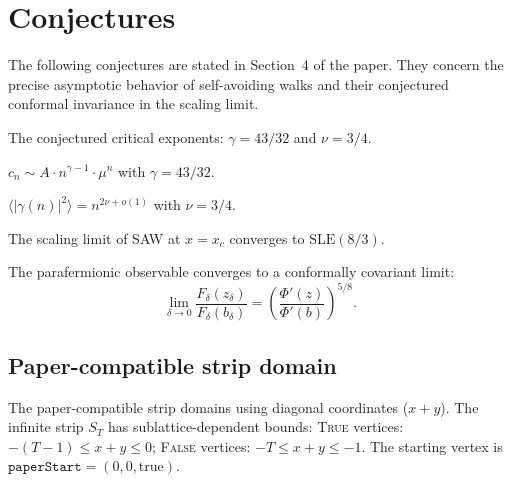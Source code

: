 \chapter{Conjectures}\label{chap:conjectures}

The following conjectures are stated in Section~4 of the paper.
They concern the precise asymptotic behavior of self-avoiding walks
and their conjectured conformal invariance in the scaling limit.

\begin{definition}\label{def:exponents}
\leanok
{}
  The conjectured critical exponents: $\gamma = 43/32$ and $\nu = 3/4$.
\end{definition}

\begin{conjecture}\label{conj:nienhuis}
\leanok
{}
  $c_n \sim A \cdot n^{\gamma-1} \cdot \mu^n$ with $\gamma = 43/32$.
\end{conjecture}

\begin{conjecture}\label{conj:flory}
\leanok
{}
  $\langle |\gamma(n)|^2 \rangle = n^{2\nu + o(1)}$ with $\nu = 3/4$.
\end{conjecture}

\begin{conjecture}\label{conj:sle}
\leanok
{}
  The scaling limit of SAW at $x = x_c$ converges to $\mathrm{SLE}(8/3)$.
\end{conjecture}

\begin{conjecture}\label{conj:observable}
\leanok
{}
  The parafermionic observable converges to a conformally covariant limit:
  \[ \lim_{\delta \to 0} \frac{F_\delta(z_\delta)}{F_\delta(b_\delta)}
     = \left(\frac{\Phi'(z)}{\Phi'(b)}\right)^{5/8}. \]
\end{conjecture}

\section{Paper-compatible strip domain}

\begin{definition}\label{def:paper_strip}
\leanok
{}
  The paper-compatible strip domains using diagonal coordinates ($x+y$).
  The infinite strip $S_T$ has sublattice-dependent bounds:
  \textsc{True} vertices: $-(T-1) \leq x+y \leq 0$;
  \textsc{False} vertices: $-T \leq x+y \leq -1$.
  The starting vertex is $\texttt{paperStart} = (0,0,\text{true})$.
\end{definition}

